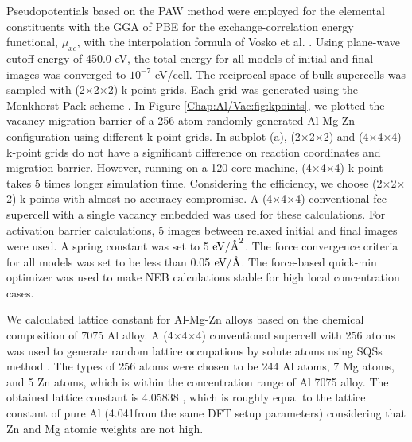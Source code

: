 Pseudopotentials based on the \ac{PAW} method were employed for the elemental constituents with the \ac{GGA} of \ac{PBE} for the exchange-correlation energy functional, $\mu_{xc}$, with the interpolation formula of Vosko et al. \cite{vosko1980accurate}. Using plane-wave cutoff energy of 450.0 eV, the total energy for all models of initial and final images was converged to $10^{−7}$ eV/cell. The reciprocal space of bulk supercells was sampled with (2$\times$2$\times$2) k-point grids. Each grid was generated using the Monkhorst-Pack scheme \cite{monkhorst1976special}. In Figure \ref{Chap:Al/Vac:fig:kpoints}, we plotted the vacancy migration barrier of a 256-atom randomly generated Al-Mg-Zn configuration using different k-point grids. In subplot (a), (2$\times$2$\times$2) and (4$\times$4$\times$4) k-point grids do not have a significant difference on reaction coordinates and migration barrier. However, running on a 120-core machine, (4$\times$4$\times$4) k-point takes 5 times longer simulation time. Considering the efficiency, we choose (2$\times$2$\times$2) k-points with almost no accuracy compromise. A (4$\times$4$\times$4) conventional fcc supercell with a single vacancy embedded was used for these calculations. For activation barrier calculations, 5 images between relaxed initial and final images were used. A spring constant was set to 5 $\text{eV}/\mbox{\normalfont\AA}^2$. The force convergence criteria for all models was set to be less than 0.05 $\text{eV}/\mbox{\normalfont\AA}$. The force-based quick-min optimizer was used to make \ac{NEB} calculations stable for high local concentration cases\cite{sheppard2008optimization}.


We calculated lattice constant for Al-Mg-Zn alloys based on the chemical composition of  7075 Al alloy. A (4$\times$4$\times$4) conventional supercell with 256 atoms was used to generate random lattice occupations by solute atoms using \acfp{SQS} method \cite{zunger1990special}. The types of 256 atoms were chosen to be 244 Al atoms, 7 Mg atoms, and 5 Zn atoms, which is within the concentration range of Al 7075 alloy. The obtained lattice constant is 4.05838 \angstrom, which is roughly equal to the lattice constant of pure Al (4.041\angstrom from the same DFT setup parameters) considering that Zn and Mg atomic weights are not high\cite{haas2009calculation}.


